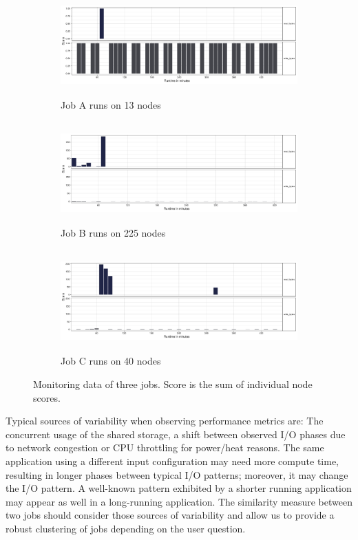 \documentclass[]{llncs}
\begin{document}
\begin{figure}
        \centering
\begin{subfigure}[t]{\textwidth}
 \includegraphics[width=4.61in,height=1.54in]{./media/image27.png}
         \caption{Job A runs on 13 nodes}
         \label{fig:typ_io:1}
 \end{subfigure}

        \begin{subfigure}[t]{\textwidth}
 \includegraphics[width=4.61in,height=1.54in]{./media/image28.png}
         \caption{Job B runs on 225 nodes}
         \label{fig:typ_io:2}
  \end{subfigure}

        \begin{subfigure}[t]{\textwidth}
 \includegraphics[width=4.61in,height=1.54in]{./media/image25.png}
         \caption{Job C runs on 40 nodes}
         \label{fig:typ_io:3}
  \end{subfigure}

\caption{Monitoring data of three jobs. Score is the sum of individual node scores.}
         \label{fig:typ_io:all}
\end{figure}

Typical sources of variability when observing performance metrics are: The concurrent usage of the shared storage, a shift between observed I/O phases due to network congestion or CPU throttling for power/heat reasons.
The same application using a different input configuration may need more compute time, resulting in longer phases between typical I/O patterns; moreover, it may change the I/O pattern.
A well-known pattern exhibited by a shorter running application may appear as well in a long-running application.
The similarity measure between two jobs should consider those sources of variability and allow us to provide a robust clustering of jobs depending on the user question.
\end{document}
